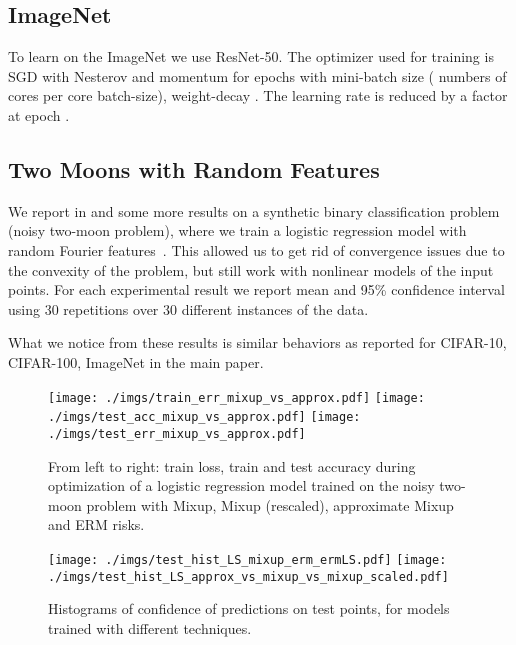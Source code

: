 \documentclass[twoside,11pt]{article}
\begin{document}
\subsection{ImageNet}
To learn on the ImageNet we use ResNet-50.
The optimizer used for training is SGD with Nesterov and momentum  for  epochs 
with mini-batch size  ( numbers of cores  per core batch-size), weight-decay .
The learning rate is  reduced by a factor  at epoch .

\subsection{Two Moons with Random Features}
We report in  and  some more results on a synthetic binary classification problem (noisy two-moon problem),
where we train a logistic regression model with random Fourier features~\citep{rahimi2008random}.
This allowed us to get rid of convergence issues due to the convexity of the problem, but still work with nonlinear models of the input points. 
For each experimental result we report mean and 95\% confidence interval using 30 repetitions over 30 different instances of the data.

What we notice from these results is similar behaviors as reported for CIFAR-10, CIFAR-100, ImageNet in the main paper. 
\begin{figure*}[ht]
\hfill
    \texttt{[image: ./imgs/train\_err\_mixup\_vs\_approx.pdf]}
    \endminipage\hfill
    \texttt{[image: ./imgs/test\_acc\_mixup\_vs\_approx.pdf]}
    \endminipage\hfill 
    \texttt{[image: ./imgs/test\_err\_mixup\_vs\_approx.pdf]}
    \endminipage\hfill
\caption{
        \small{From left to right: train loss, 
        train and test accuracy during optimization of a 
        logistic regression model trained on the noisy two-moon problem with Mixup, Mixup (rescaled), 
        approximate Mixup and ERM risks.}
        }\label{fig:mess_vs_approx_acc_twomoons}
\end{figure*} 
\begin{figure*}[h]
\centering
    \texttt{[image: ./imgs/test\_hist\_LS\_mixup\_erm\_ermLS.pdf]}
    \endminipage
    \hspace{1cm}
    \texttt{[image: ./imgs/test\_hist\_LS\_approx\_vs\_mixup\_vs\_mixup\_scaled.pdf]}
    \endminipage\hfill
    \caption{\small{Histograms of confidence of predictions on test points, for models trained with different techniques.}}\label{fig:hist_twomoon}
\end{figure*}
\end{document}

